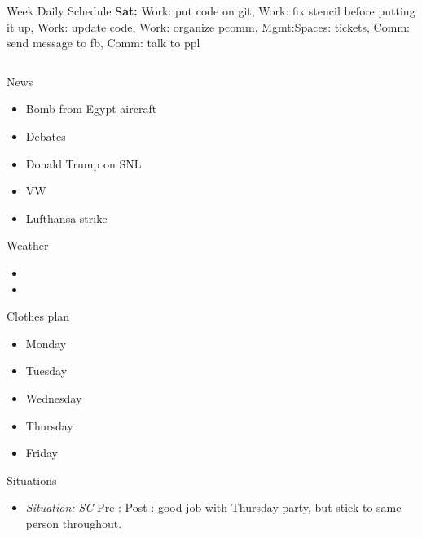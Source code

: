 \begin{frame}
\begin{columns}
\begin{column}{0.50\linewidth}
\begin{block}{Week Daily Schedule}
{          \textbf{Sat:} \small Work: put code on git, Work: fix
          stencil before putting it up, Work: update code, Work:
          organize pcomm, 
          Mgmt:Spaces: tickets,  
          Comm: send message to fb, Comm: talk to ppl  }


    \begin{column}{0.20\linewidth}
      \begin{block}{News}
        \begin{itemize} 
          \tiny \item \tiny Bomb from Egypt aircraft 
        \item \tiny Debates 
        \item \tiny Donald Trump on SNL 
        \item \tiny VW 
        \item \tiny Lufthansa strike  
        \end{itemize}
      \end{block}
      
      \begin{block}{Weather} 
        \begin{itemize}
          \tiny \item \tiny 
        \item \tiny 
        \end{itemize}
      \end{block}  

      \begin{block}{Clothes plan} 
        \begin{itemize}
          \tiny \item \tiny Monday
        \item \tiny Tuesday 
        \item \tiny Wednesday
        \item \tiny Thursday
        \item \tiny Friday 
        \end{itemize} 
      \end{block}

      \begin{block}{Situations}
        \begin{itemize} 
          \tiny \item \tiny \textit{Situation: SC}  
          Pre-:   Post-:  good job with Thursday party, but stick to
          same person throughout. 


\end{itemize}
\end{block}
\end{column}
\end{block}
\end{column}
\end{columns}
\end{frame}
